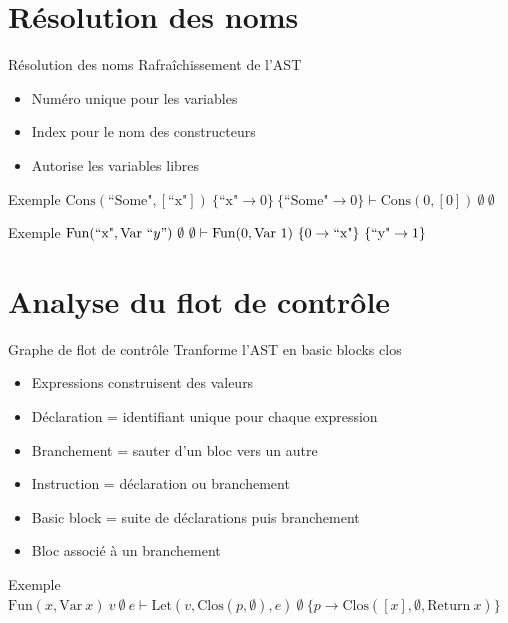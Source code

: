 \documentclass{beamer}
\begin{document}
\section{Résolution des noms}

\begin{frame}{Résolution des noms}
    Rafraîchissement de l'AST

    \begin{itemize}
        \item Numéro unique pour les variables
        \item Index pour le nom des constructeurs
        \item Autorise les variables libres
    \end{itemize}

    \begin{exampleblock}{Exemple}
        $\text{Cons}(\text{``Some"}, [\text{``x"}]) ~ \lbrace \text{``x"} \rightarrow 0 \rbrace ~ \lbrace \text{``Some"} \rightarrow 0 \rbrace \vdash \text{Cons}(0, [0]) ~ \emptyset ~ \emptyset$
    \end{exampleblock}

    \begin{exampleblock}{Exemple}
        $\text{Fun}(\text{``x"}, \text{Var} ~ ``y") ~ \emptyset ~ \emptyset \vdash \text{Fun}(0, \text{Var} ~ 1) ~ \lbrace 0 \rightarrow \text{``x"} \rbrace ~ \lbrace \text{``y"} \rightarrow 1 \rbrace$
    \end{exampleblock}
\end{frame}

\section{Analyse du flot de contrôle}

\begin{frame}{Graphe de flot de contrôle}
    Tranforme l'AST en basic blocks \alert{clos}

    \begin{itemize}
        \item Expressions construisent des valeurs
        \item Déclaration = identifiant unique pour chaque expression
        \item Branchement = sauter d'un bloc vers un autre
        \item Instruction = déclaration ou branchement
        \item Basic block = suite de déclarations puis branchement
        \item Bloc associé à un branchement
    \end{itemize}

    \begin{exampleblock}{Exemple}
        $\text{Fun}(x, \text{Var} ~ x) ~ v ~ \emptyset ~ e \vdash \text{Let}(v, \text{Clos}(p, \emptyset), e) ~ \emptyset ~ \lbrace p \rightarrow \text{Clos}([x], \emptyset, \text{Return} ~ x) \rbrace$
    \end{exampleblock}
\end{frame}
\end{document}
